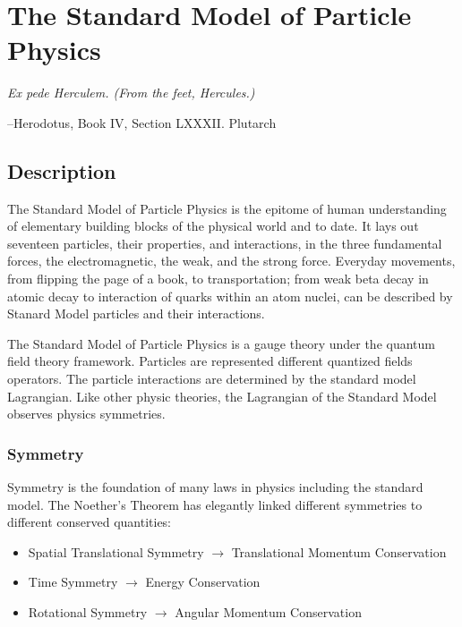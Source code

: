 \chapter{The Standard Model of Particle Physics}
\label{chapter:SM}

	
\epigraph{\textit{Ex pede Herculem. \newline(From the feet, Hercules.)}}{--Herodotus, Book IV, Section LXXXII. Plutarch}




\section{Description}
The Standard Model of Particle Physics is the epitome of human understanding of elementary building blocks of the physical world and to date. It lays out seventeen particles, their properties, and interactions, in the three fundamental forces, the electromagnetic, the weak, and the strong force. Everyday movements, from flipping the page of a book, to transportation; from weak beta decay in atomic decay to interaction of quarks within an atom nuclei, can be described by Stanard Model
particles and their interactions.

The Standard Model of Particle Physics is a gauge theory under the quantum field theory framework. Particles are represented different quantized fields operators. The particle interactions are determined by the standard model Lagrangian. Like other physic theories, the Lagrangian of the Standard Model observes physics symmetries.

\subsection*{Symmetry}
    Symmetry is the foundation of many laws in physics including the standard model. The Noether's Theorem has elegantly linked different symmetries to different conserved quantities:

    \begin{itemize}
        \item Spatial Translational Symmetry $\rightarrow$ Translational Momentum Conservation

        \item Time Symmetry $\rightarrow$ Energy Conservation

        \item Rotational Symmetry $\rightarrow$ Angular Momentum Conservation

    \end{itemize}

